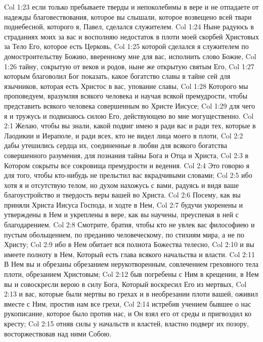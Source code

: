 \vs Col 1:23 если только пребываете тверды и непоколебимы в вере и не отпадаете от надежды благовествования, которое вы слышали, которое возвещено всей твари поднебесной, которого я, Павел, сделался служителем.
\rsbpar\vs Col 1:24 Ныне радуюсь в страданиях моих за вас и восполняю недостаток в плоти моей скорбей Христовых за Тело Его, которое есть Церковь,
\vs Col 1:25 которой сделался я служителем по домостроительству Божию, вверенному мне для вас,  исполнить слово Божие,
\vs Col 1:26 тайну, сокрытую от веков и родов, ныне же открытую святым Его,
\vs Col 1:27 которым благоволил Бог показать, какое богатство славы в тайне сей для язычников, которая есть Христос в вас, упование славы,
\vs Col 1:28 Которого мы проповедуем, вразумляя всякого человека и научая всякой премудрости, чтобы представить всякого человека совершенным во Христе Иисусе;
\vs Col 1:29 для чего я и тружусь и подвизаюсь силою Его, действующею во мне могущественно.
\vs Col 2:1 Желаю, чтобы вы знали, какой подвиг имею я ради вас и ради тех, которые в Лаодикии и Иераполе, и ради всех, кто не видел лица моего в плоти,
\vs Col 2:2 дабы утешились сердца их, соединенные в любви для всякого богатства совершенного разумения, для познания тайны Бога и Отца и Христа,
\vs Col 2:3 в Котором сокрыты все сокровища премудрости и ведения.
\vs Col 2:4 Это говорю я для того, чтобы кто-нибудь не прельстил вас вкрадчивыми словами;
\vs Col 2:5 ибо хотя я и отсутствую телом, но духом нахожусь с вами, радуясь и видя ваше благоустройство и твердость веры вашей во Христа.
\vs Col 2:6 Посему, как вы приняли Христа Иисуса Господа,  и ходте в Нем,
\vs Col 2:7 будучи укоренены и утверждены в Нем и укреплены в вере, как вы научены, преуспевая в ней с благодарением.
\rsbpar\vs Col 2:8 Смотрите, братия, чтобы кто не увлек вас философиею и пустым обольщением, по преданию человеческому, по стихиям мира, а не по Христу;
\vs Col 2:9 ибо в Нем обитает вся полнота Божества телесно,
\vs Col 2:10 и вы имеете полноту в Нем, Который есть глава всякого начальства и власти.
\vs Col 2:11 В Нем вы и обрезаны обрезанием нерукотворенным, совлечением греховного тела плоти, обрезанием Христовым;
\vs Col 2:12 быв погребены с Ним в крещении, в Нем вы и совоскресли верою в силу Бога, Который воскресил Его из мертвых,
\vs Col 2:13 и вас, которые были мертвы во грехах и в необрезании плоти вашей, оживил вместе с Ним, простив нам все грехи,
\vs Col 2:14 истребив учением бывшее о нас рукописание, которое было против нас, и Он взял его от среды и пригвоздил ко кресту;
\vs Col 2:15 отняв силы у начальств и властей, властно подверг их позору, восторжествовав над ними Собою.
